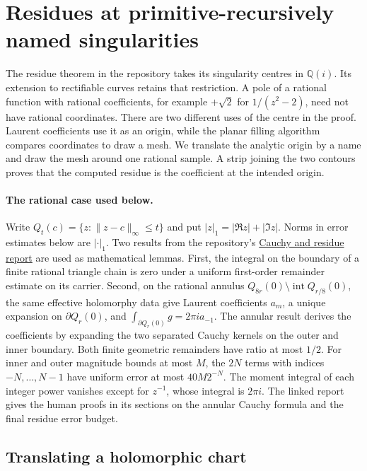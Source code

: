 \section{Residues at primitive-recursively named singularities}
\label{sec:namedresidue}

The residue theorem in the repository takes its singularity centres in
$\mathbb Q(i)$. Its extension to rectifiable curves retains that restriction.
A pole of a rational function with rational coefficients, for example
$+\sqrt{2}$ for $1/(z^2-2)$, need not have rational coordinates.
There are two different uses of the centre in the proof. Laurent
coefficients use it as an origin, while the planar filling algorithm
compares coordinates to draw a mesh. We translate the analytic origin
by a name and draw the mesh around one rational sample. A strip joining
the two contours proves that the computed residue is the coefficient at
the intended origin.

\paragraph{The rational case used below.}
Write $Q_t(c)=\{z:\lVert z-c\rVert_\infty\le t\}$ and put
$|z|_1=|\Re z|+|\Im z|$. Norms in error estimates below are $|\cdot|_1$.
Two results from the repository's
\href{https://github.com/VladimirReshetnikov/ProveIt/blob/5f3be02388442f16487d2dc5c2529961dd783d2b/Logic/PrimitiveRecursiveArithmetic/docs/proofs/analysis/cauchy_residue_ipra/report.tex}{Cauchy and residue report}
are used as mathematical lemmas. First, the integral on the boundary of
a finite rational triangle chain is zero under a uniform first-order
remainder estimate on its carrier. Second, on the rational annulus
$Q_{8r}(0)\setminus\operatorname{int} Q_{r/8}(0)$, the same effective
holomorphy data give Laurent coefficients $a_m$, a unique expansion on
$\partial Q_r(0)$, and $\int_{\partial Q_r(0)}g=2\pi i a_{-1}$.
The annular result derives the coefficients by expanding the two separated
Cauchy kernels on the outer and inner boundary. Both finite geometric
remainders have ratio at most $1/2$. For inner and outer magnitude bounds
at most $M$, the $2N$ terms with indices $-N,\ldots,N-1$ have uniform
error at most $40M2^{-N}$. The moment integral of each integer power
vanishes except for $z^{-1}$, whose integral is $2\pi i$. The linked
report gives the human proofs in its sections on the annular Cauchy
formula and the final residue error budget.

\subsection{Translating a holomorphic chart}

